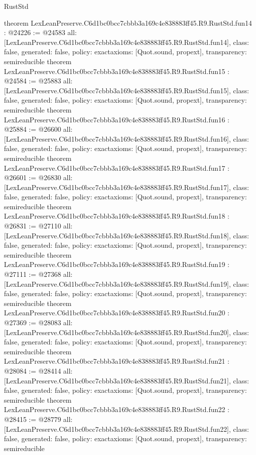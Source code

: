 \begin{lexlean}{RustStd}
\begin{coremodule}
{}
theorem LexLeanPreserve.C6d1bc0bcc7cbbb3a169c4e838883ff45.R9.RustStd.fun14 : @24226 := @24583 {
  all: [LexLeanPreserve.C6d1bc0bcc7cbbb3a169c4e838883ff45.R9.RustStd.fun14],
  class: false,
  generated: false,
  policy: exact{axioms: [Quot.sound, propext]},
  transparency: semireducible
}
theorem LexLeanPreserve.C6d1bc0bcc7cbbb3a169c4e838883ff45.R9.RustStd.fun15 : @24584 := @25883 {
  all: [LexLeanPreserve.C6d1bc0bcc7cbbb3a169c4e838883ff45.R9.RustStd.fun15],
  class: false,
  generated: false,
  policy: exact{axioms: [Quot.sound, propext]},
  transparency: semireducible
}
theorem LexLeanPreserve.C6d1bc0bcc7cbbb3a169c4e838883ff45.R9.RustStd.fun16 : @25884 := @26600 {
  all: [LexLeanPreserve.C6d1bc0bcc7cbbb3a169c4e838883ff45.R9.RustStd.fun16],
  class: false,
  generated: false,
  policy: exact{axioms: [Quot.sound, propext]},
  transparency: semireducible
}
theorem LexLeanPreserve.C6d1bc0bcc7cbbb3a169c4e838883ff45.R9.RustStd.fun17 : @26601 := @26830 {
  all: [LexLeanPreserve.C6d1bc0bcc7cbbb3a169c4e838883ff45.R9.RustStd.fun17],
  class: false,
  generated: false,
  policy: exact{axioms: [Quot.sound, propext]},
  transparency: semireducible
}
theorem LexLeanPreserve.C6d1bc0bcc7cbbb3a169c4e838883ff45.R9.RustStd.fun18 : @26831 := @27110 {
  all: [LexLeanPreserve.C6d1bc0bcc7cbbb3a169c4e838883ff45.R9.RustStd.fun18],
  class: false,
  generated: false,
  policy: exact{axioms: [Quot.sound, propext]},
  transparency: semireducible
}
theorem LexLeanPreserve.C6d1bc0bcc7cbbb3a169c4e838883ff45.R9.RustStd.fun19 : @27111 := @27368 {
  all: [LexLeanPreserve.C6d1bc0bcc7cbbb3a169c4e838883ff45.R9.RustStd.fun19],
  class: false,
  generated: false,
  policy: exact{axioms: [Quot.sound, propext]},
  transparency: semireducible
}
theorem LexLeanPreserve.C6d1bc0bcc7cbbb3a169c4e838883ff45.R9.RustStd.fun20 : @27369 := @28083 {
  all: [LexLeanPreserve.C6d1bc0bcc7cbbb3a169c4e838883ff45.R9.RustStd.fun20],
  class: false,
  generated: false,
  policy: exact{axioms: [Quot.sound, propext]},
  transparency: semireducible
}
theorem LexLeanPreserve.C6d1bc0bcc7cbbb3a169c4e838883ff45.R9.RustStd.fun21 : @28084 := @28414 {
  all: [LexLeanPreserve.C6d1bc0bcc7cbbb3a169c4e838883ff45.R9.RustStd.fun21],
  class: false,
  generated: false,
  policy: exact{axioms: [Quot.sound, propext]},
  transparency: semireducible
}
theorem LexLeanPreserve.C6d1bc0bcc7cbbb3a169c4e838883ff45.R9.RustStd.fun22 : @28415 := @28779 {
  all: [LexLeanPreserve.C6d1bc0bcc7cbbb3a169c4e838883ff45.R9.RustStd.fun22],
  class: false,
  generated: false,
  policy: exact{axioms: [Quot.sound, propext]},
  transparency: semireducible
}
\end{coremodule}
\end{lexlean}
